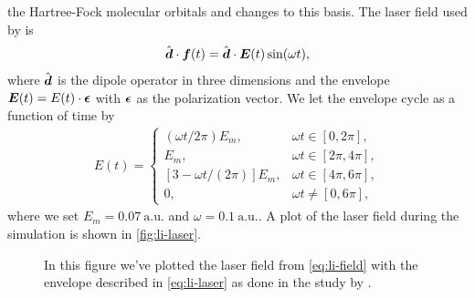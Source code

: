             the Hartree-Fock molecular orbitals and changes to this basis.
            The laser field used by \citeauthor{li_2005} is
            \begin{align}
                \hat{\boldsymbol{d}} \cdot \boldsymbol{f}(t)
                = \hat{\boldsymbol{d}} \cdot \boldsymbol{E}(t)\sin(\omega t),
                \label{eq:li-field}
            \end{align}
            where $\hat{\boldsymbol{d}}$ is the dipole operator in three dimensions and
            the envelope $\boldsymbol{E}(t) = E(t) \cdot \boldsymbol{\epsilon}$ with
            $\boldsymbol{\epsilon}$ as the polarization vector.
            We let the envelope cycle as a function of time by
            \begin{align}
                E(t) = \begin{cases}
                    (\omega t / 2\pi) E_m, & \omega t \in [0, 2\pi], \\
                    E_m, & \omega t \in [2\pi, 4\pi], \\
                    [3 - \omega t / (2\pi)] E_m, & \omega t \in [4\pi, 6\pi], \\
                    0, & \omega t \neq [0, 6\pi],
                \end{cases}
                \label{eq:li-laser}
            \end{align}
            where we set $E_m = \SI{0.07}{\text{a.u.}}$ and $\omega =
            \SI{0.1}{\text{a.u.}}$.
            A plot of the laser field during the simulation is shown in
            \autoref{fig:li-laser}.
            \begin{figure}
                \centering
                \caption{In this figure we've plotted the laser field from
                \autoref{eq:li-field} with the envelope described in
                \autoref{eq:li-laser} as done in the study by
                \citeauthor{li_2005} \cite{li_2005}.}
                \label{fig:li-laser}
            \end{figure}
